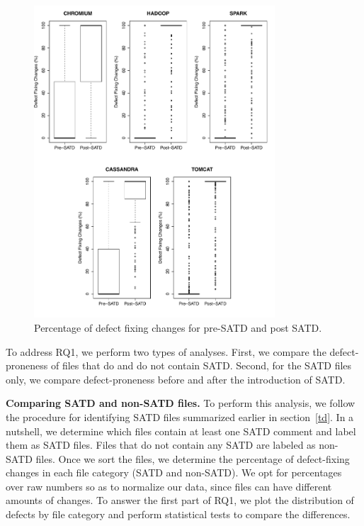 \begin{figure}[tb]
	\centering
	\includegraphics[width=90mm]{figures/chapter3/rq1-2_correction}
	\caption{Percentage of defect fixing changes for  pre-SATD and post SATD.}
	\label{figure:preVpost}
\end{figure}

 To address RQ1, we perform two types of analyses. First, we compare the defect-proneness of files that do and do not contain SATD. Second, for the SATD files only, we compare defect-proneness before and after the introduction of SATD.

\noindent\textbf{Comparing SATD and non-SATD files.} To perform this analysis, we follow the procedure for identifying SATD files summarized earlier in section~\ref{td}. In a nutshell, we determine which files contain at least one SATD comment and label them as SATD files. Files that do not contain any SATD are labeled as non-SATD files. Once we sort the files, we determine the percentage of defect-fixing changes in each file category (SATD and non-SATD). We opt for percentages over raw numbers so as to normalize our data, since files can have different amounts of changes. To answer the first part of RQ1, we plot the distribution of defects by file category and perform statistical tests to compare the differences.


